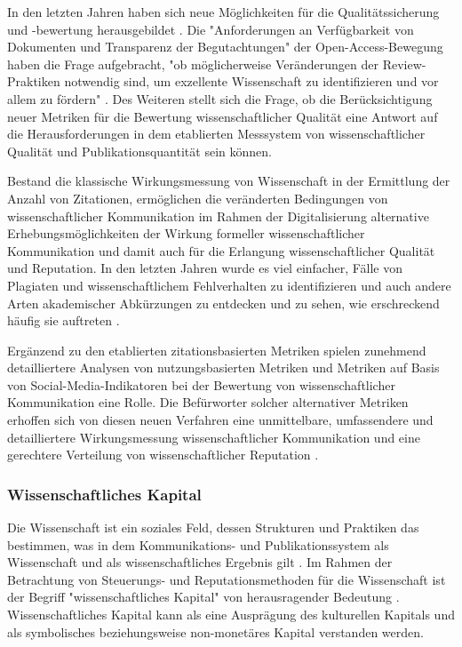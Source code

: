 In den letzten Jahren haben sich neue Möglichkeiten für die Qualitätssicherung und -bewertung herausgebildet \cite{Rekdal_2014}. Die "Anforderungen an Verfügbarkeit von Dokumenten und Transparenz der Begutachtungen" der Open-Access-Bewegung haben die Frage aufgebracht, "ob möglicherweise Veränderungen der Review-Praktiken notwendig sind, um exzellente Wissenschaft zu identifizieren und vor allem zu fördern" \cite[:5]{Neidhardt_2006}. Des Weiteren stellt sich die Frage, ob die Berücksichtigung neuer Metriken für die Bewertung wissenschaftlicher Qualität eine Antwort auf die Herausforderungen in dem etablierten Messsystem von wissenschaftlicher Qualität und Publikationsquantität sein können.

Bestand die klassische Wirkungsmessung von Wissenschaft in der Ermittlung der Anzahl von Zitationen, ermöglichen die veränderten Bedingungen von wissenschaftlicher Kommunikation im Rahmen der Digitalisierung alternative Erhebungsmöglichkeiten der Wirkung formeller wissenschaftlicher Kommunikation und damit auch für die Erlangung wissenschaftlicher Qualität und Reputation. In den letzten Jahren wurde es viel einfacher, Fälle von Plagiaten und wissenschaftlichem Fehlverhalten zu identifizieren und auch andere Arten akademischer Abkürzungen zu entdecken und zu sehen, wie erschreckend häufig sie auftreten \cite{Rekdal_2014}.

Ergänzend zu den etablierten zitationsbasierten Metriken spielen zunehmend detailliertere Analysen von nutzungsbasierten Metriken und Metriken auf Basis von Social-Media-Indikatoren \cite{Peters_2015} bei der Bewertung von wissenschaftlicher Kommunikation eine Rolle. Die Befürworter solcher alternativer Metriken erhoffen sich von diesen neuen Verfahren eine unmittelbare, umfassendere und detailliertere Wirkungsmessung wissenschaftlicher Kommunikation und eine gerechtere Verteilung von wissenschaftlicher Reputation \cite{Peters_2015} \cite{Herb_2012a} \cite{DORA_2013}.

\subsubsection{Wissenschaftliches Kapital}

Die Wissenschaft ist ein soziales Feld, dessen Strukturen und Praktiken das bestimmen, was in dem Kommunikations- und Publikationssystem als Wissenschaft und als wissenschaftliches Ergebnis gilt \cite{Mikl_2010}. Im Rahmen der Betrachtung von Steuerungs- und Reputationsmethoden für die Wissenschaft ist der Begriff "wissenschaftliches Kapital" von herausragender Bedeutung \cite{Barloesius_2008}. Wissenschaftliches Kapital kann als eine Ausprägung des kulturellen Kapitals und als symbolisches beziehungsweise non-monetäres Kapital \cite{Irmer_2011} \cite{Hagner_2015} \cite{Bourdieu_1988} verstanden werden.


